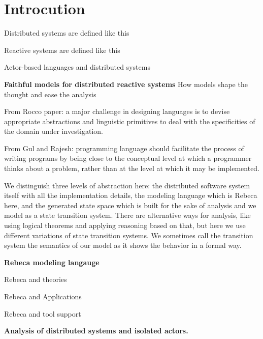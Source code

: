 \section{Introcution} \label{sec::introduction}



Distributed systems  are defined like this

Reactive systems are defined like this

Actor-based languages and distributed systems

\noindent\textbf{Faithful models for distributed reactive systems} %
How models shape the thought and ease the analysis

From Rocco paper: a major challenge in designing languages is to devise appropriate abstractions and linguistic primitives to deal with the specificities of the domain under investigation.

From Gul and Rajesh: 
programming language should facilitate the process of writing programs by being close to the conceptual level at which a programmer thinks about a problem, rather than at the level at which it may be implemented. 

We distinguish three levels of abstraction here: the distributed software system itself with all the implementation details, the modeling language which is Rebeca here, and the generated state space which is built for the sake of analysis and  we model as a state transition system. There are alternative ways for analysis, like using logical theorems and applying reasoning based on that, but here we use different variations of state transition systems.
We sometimes call the transition system the semantics of our model as it shows the behavior in a formal way.

\noindent\textbf{Rebeca modeling langauge}

Rebeca and theories

Rebeca and Applications

Rebeca and tool support

\noindent\textbf{Analysis of distributed systems and isolated actors.}

